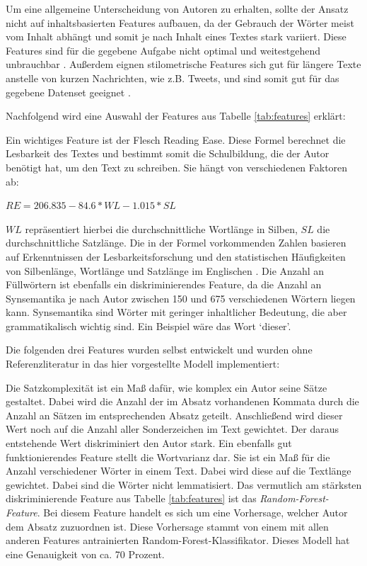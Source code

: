 \documentclass[conference]{IEEEtran}
\begin{document}
	Um eine allgemeine Unterscheidung von Autoren zu erhalten, sollte der Ansatz nicht auf inhaltsbasierten Features aufbauen, da der Gebrauch der Wörter meist vom Inhalt abhängt und somit je nach Inhalt eines Textes stark variiert. Diese Features sind für die gegebene Aufgabe nicht optimal und weitestgehend unbrauchbar \cite{mf_b2}.
	Außerdem eignen stilometrische Features sich gut für längere Texte anstelle von kurzen Nachrichten, wie z.B. Tweets, und sind somit gut für das gegebene Datenset geeignet \cite{mf_b3}.
	
	Nachfolgend wird eine Auswahl der Features aus Tabelle \ref{tab:features} erklärt:
	
	Ein wichtiges Feature ist der Flesch Reading Ease. Diese Formel berechnet die Lesbarkeit des Textes und bestimmt somit die Schulbildung, die der Autor benötigt hat, um den Text zu schreiben. Sie hängt von verschiedenen Faktoren ab:
	
	\bigskip
	$RE = 206.835 - 84.6*WL - 1.015*SL$ \cite{mf_b7}
	\bigskip
	
	$WL$ repräsentiert hierbei die durchschnittliche Wortlänge in Silben, $SL$ die durchschnittliche Satzlänge. Die in der Formel vorkommenden Zahlen basieren auf Erkenntnissen der Lesbarkeitsforschung und den statistischen Häufigkeiten von Silbenlänge, Wortlänge und Satzlänge im Englischen \cite{mf_b4}. \newline 
	Die Anzahl an Füllwörtern ist ebenfalls ein diskriminierendes Feature, da die Anzahl an Synsemantika je nach Autor zwischen 150 und 675 verschiedenen Wörtern liegen kann. Synsemantika sind Wörter mit geringer inhaltlicher Bedeutung, die aber grammatikalisch wichtig sind. Ein Beispiel wäre das Wort ‘dieser’. \cite{mf_b5}
	
	Die folgenden drei Features wurden selbst entwickelt und wurden ohne Referenzliteratur in das hier vorgestellte Modell implementiert:
	
	Die Satzkomplexität ist ein Maß dafür, wie komplex ein Autor seine Sätze gestaltet. Dabei wird die Anzahl der im Absatz vorhandenen Kommata durch die Anzahl an Sätzen im entsprechenden Absatz geteilt. Anschließend wird dieser Wert noch auf die Anzahl aller Sonderzeichen im Text gewichtet. Der daraus entstehende Wert diskriminiert den Autor stark. \newline Ein ebenfalls gut funktionierendes Feature stellt die Wortvarianz dar. Sie ist ein Maß für die Anzahl verschiedener Wörter in einem Text. Dabei wird diese auf die Textlänge gewichtet. Dabei sind die Wörter nicht lemmatisiert. \newline Das vermutlich am stärksten diskriminierende Feature aus Tabelle \ref{tab:features} ist das \textit{Random-Forest-Feature}. Bei diesem Feature handelt es sich um eine Vorhersage, welcher Autor dem Absatz zuzuordnen ist. Diese Vorhersage stammt von einem mit allen anderen Features antrainierten Random-Forest-Klassifikator. Dieses Modell hat eine Genauigkeit von ca. 70 Prozent.
	
\end{document}
